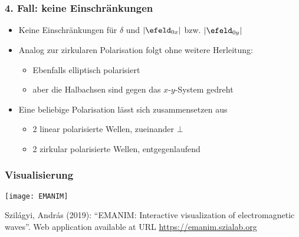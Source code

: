 \begin{frame}
  \frametitle{4. Fall: keine Einschränkungen}
  \begin{itemize}[<+->]
  \item Keine Einschränkungen für \(\delta\) und \(\vert \efeld_{0x} \vert\) bzw. \(\vert \efeld_{0y} \vert  \)
  \item Analog zur zirkularen Polarisation folgt ohne weitere Herleitung:
    \begin{itemize}[<+->]
    \item Ebenfalls \alert{elliptisch polarisiert}
      \item aber die Halbachsen sind gegen das \(x\)-\(y\)-System gedreht
      \end{itemize}

\item Eine beliebige Polarisation lässt sich zusammensetzen aus
\begin{itemize}
\item 2 linear polarisierte Wellen, zueinander $\bot$
\item 2 zirkular polarisierte Wellen, entgegenlaufend
\end{itemize}
\end{itemize}
\end{frame}

\begin{frame}
  \frametitle{Visualisierung}
  \texttt{[image: EMANIM]}
  
  Szilágyi, András (2019): \enquote{EMANIM: Interactive visualization of electromagnetic waves}. Web application available at URL \url{https://emanim.szialab.org}
\end{frame}




   
